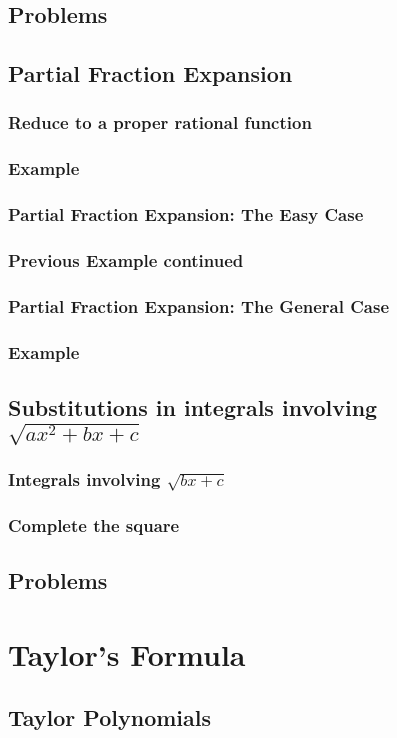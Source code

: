 \section{Problems}
\section{Partial Fraction Expansion}
\subsection{Reduce to a proper rational function}
\subsection{Example}
\subsection{Partial Fraction Expansion: The Easy Case}
\subsection{Previous Example continued}
\subsection{Partial Fraction Expansion: The General Case}
\subsection{Example}
\section{Substitutions in integrals involving $\sqrt{ax^2+bx+c}$}
\subsection{Integrals involving $\sqrt{bx+c}$}
\subsection{Complete the square}
\section{Problems}
\chapter{Taylor's Formula}
\section{Taylor Polynomials}

